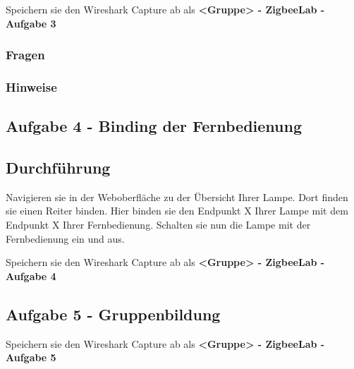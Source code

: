 \begin{Aufgabe}
    Speichern sie den Wireshark Capture ab als \textbf{\grqq <Gruppe> - ZigbeeLab - Aufgabe 3\grqq{}}
\end{Aufgabe}

\subsubsection{Fragen}

\subsubsection{Hinweise}

\subsection{Aufgabe 4 - Binding der Fernbedienung}

\subsection{Durchführung}

Navigieren sie in der Weboberfläche zu der Übersicht Ihrer Lampe. Dort finden sie einen Reiter \grqq binden\grqq{}. Hier binden sie den Endpunkt X Ihrer Lampe mit dem Endpunkt X Ihrer Fernbedienung. 
Schalten sie nun die Lampe mit der Fernbedienung ein und aus. 

\begin{Hinweis}
    Speichern sie den Wireshark Capture ab als \textbf{\grqq <Gruppe> - ZigbeeLab - Aufgabe 4\grqq{}}
\end{Hinweis}

\subsection{Aufgabe 5 - Gruppenbildung}

\begin{Hinweis}
    Speichern sie den Wireshark Capture ab als \textbf{\grqq <Gruppe> - ZigbeeLab - Aufgabe 5\grqq{}}
\end{Hinweis}




